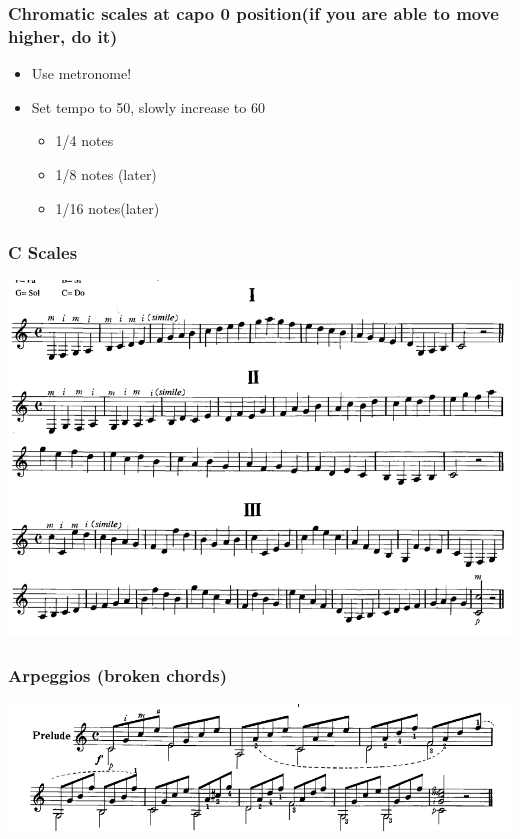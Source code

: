 \documentclass[11pt]{article}
\begin{document}
\subsubsection*{Chromatic scales at capo 0 position(if you are able to move higher, do it)}
\label{sec:org96f61ad}
\begin{itemize}
\item Use metronome!
\item Set tempo to 50, slowly increase to 60
\begin{itemize}
\item 1/4 notes
\item 1/8 notes (later)
\item 1/16 notes(later)
\end{itemize}
\end{itemize}
\subsubsection*{C Scales}
\label{sec:org4f3091b}
\begin{center}
\includegraphics[width=.9\linewidth]{./Handouts.org_20240214_221205.png}
\end{center}
\subsubsection*{Arpeggios (broken chords)}
\label{sec:org825e41b}
\begin{center}
\includegraphics[width=.9\linewidth]{./Handouts.org_20240214_222243.png}
\end{center}
\end{document}
